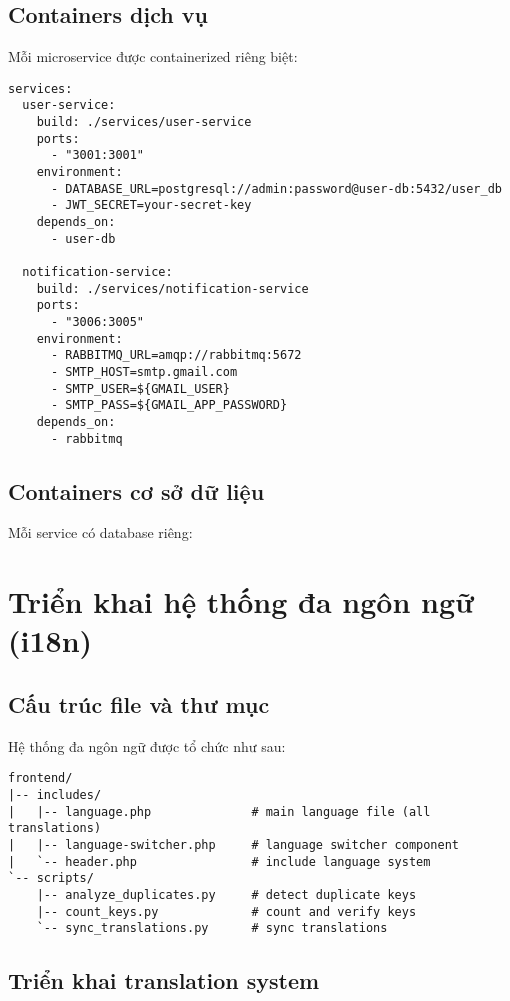 \documentclass[12pt,a4paper]{report}
\begin{document}
\subsection{Containers dịch vụ}
Mỗi microservice được containerized riêng biệt:

\begin{lstlisting}[language=text, caption=docker-compose.yml excerpt]
services:
  user-service:
    build: ./services/user-service
    ports:
      - "3001:3001"
    environment:
      - DATABASE_URL=postgresql://admin:password@user-db:5432/user_db
      - JWT_SECRET=your-secret-key
    depends_on:
      - user-db
      
  notification-service:
    build: ./services/notification-service
    ports:
      - "3006:3005"
    environment:
      - RABBITMQ_URL=amqp://rabbitmq:5672
      - SMTP_HOST=smtp.gmail.com
      - SMTP_USER=${GMAIL_USER}
      - SMTP_PASS=${GMAIL_APP_PASSWORD}
    depends_on:
      - rabbitmq
\end{lstlisting}

\subsection{Containers cơ sở dữ liệu}
Mỗi service có database riêng:


\section{Triển khai hệ thống đa ngôn ngữ (i18n)}

\subsection{Cấu trúc file và thư mục}
Hệ thống đa ngôn ngữ được tổ chức như sau:
\begin{lstlisting}[language=text, caption=i18n directory structure]
frontend/
|-- includes/
|   |-- language.php              # main language file (all translations)
|   |-- language-switcher.php     # language switcher component
|   `-- header.php                # include language system
`-- scripts/
    |-- analyze_duplicates.py     # detect duplicate keys
    |-- count_keys.py             # count and verify keys
    `-- sync_translations.py      # sync translations
\end{lstlisting}

\subsection{Triển khai translation system}
\end{document}
